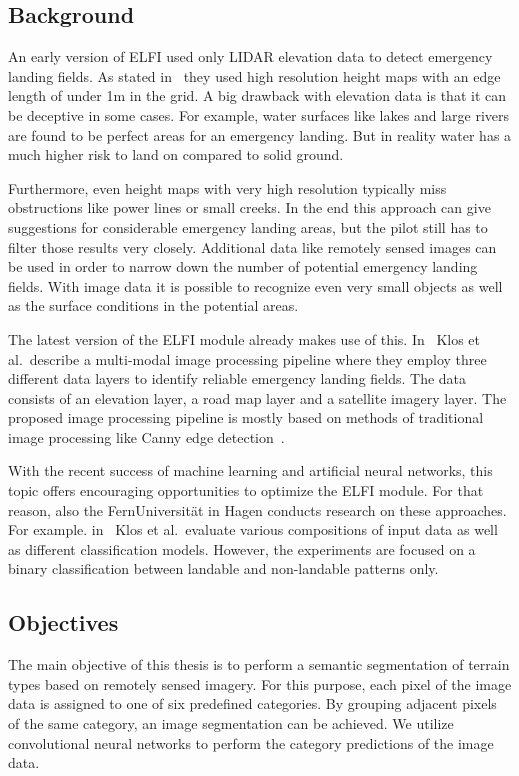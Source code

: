 \subsection{Background}
An early version of ELFI used only LIDAR elevation data to detect emergency landing fields. As stated in~\cite{feu_elfi} they used high resolution height maps with an edge length of under 1m in the grid. A big drawback with elevation data is that it can be deceptive in some cases. For example, water surfaces like lakes and large rivers are found to be perfect areas for an emergency landing. But in reality water has a much higher risk to land on compared to solid ground.

Furthermore, even height maps with very high resolution typically miss obstructions like power lines or small creeks. In the end this approach can give suggestions for considerable emergency landing areas, but the pilot still has to filter those results very closely. Additional data like remotely sensed images can be used in order to narrow down the number of potential emergency landing fields. With image data it is possible to recognize even very small objects as well as the surface conditions in the potential areas.

The latest version of the ELFI module already makes use of this. In~\cite{elfi_pipeline19} Klos et al.\ describe a multi-modal image processing pipeline where they employ three different data layers to identify reliable emergency landing fields. The data consists of an elevation layer, a road map layer and a satellite imagery layer. The proposed image processing pipeline is mostly based on methods of traditional image processing like Canny edge detection~\cite{canny_edge86}.

With the recent success of machine learning and artificial neural networks, this topic offers encouraging opportunities to optimize the ELFI module. For that reason, also the FernUniversität in Hagen conducts research on these approaches. For example. in~\cite{elfi_transfer20} Klos et al.\ evaluate various compositions of input data as well as different classification models. However, the experiments are focused on a binary classification between landable and non-landable patterns only.

\subsection{Objectives}
The main objective of this thesis is to perform a semantic segmentation of terrain types based on remotely sensed imagery. For this purpose, each pixel of the image data is assigned to one of six predefined categories. By grouping adjacent pixels of the same category, an image segmentation can be achieved. We utilize convolutional neural networks to perform the category predictions of the image data.


